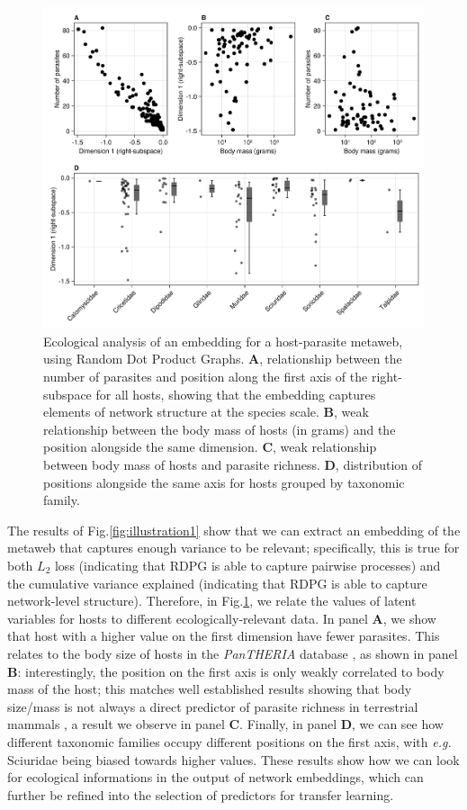\begin{figure}[h]
    \centering
    \includegraphics[width=\textwidth]{figures/illustration-part2.png}
    \caption{Ecological analysis of an embedding for a host-parasite
metaweb, using Random Dot Product Graphs. \textbf{A}, relationship
between the number of parasites and position along the first axis of the
right-subspace for all hosts, showing that the embedding captures
elements of network structure at the species scale. \textbf{B}, weak
relationship between the body mass of hosts (in grams) and the position
alongside the same dimension. \textbf{C}, weak relationship between body
mass of hosts and parasite richness. \textbf{D}, distribution of
positions alongside the same axis for hosts grouped by taxonomic
family.}
    \label{fig:illustration2}
\end{figure}

The results of Fig.\ref{fig:illustration1} show that we can extract an embedding
of the metaweb that captures enough variance to be relevant;
specifically, this is true for both \(L_2\) loss (indicating that RDPG
is able to capture pairwise processes) and the cumulative variance
explained (indicating that RDPG is able to capture network-level
structure). Therefore, in Fig.\ref{fig:illustration2}, we relate the values of
latent variables for hosts to different ecologically-relevant data. In
panel \textbf{A}, we show that host with a higher value on the first
dimension have fewer parasites. This relates to the body size of hosts
in the \emph{PanTHERIA} database \cite{Jones2009Pantheria}, as shown in
panel \textbf{B}: interestingly, the position on the first axis is only
weakly correlated to body mass of the host; this matches well
established results showing that body size/mass is not always a direct
predictor of parasite richness in terrestrial mammals
\cite{Morand1998Density}, a result we observe in panel \textbf{C}.
Finally, in panel \textbf{D}, we can see how different taxonomic
families occupy different positions on the first axis, with \emph{e.g.}
Sciuridae being biased towards higher values. These results show how we
can look for ecological informations in the output of network
embeddings, which can further be refined into the selection of
predictors for transfer learning.

